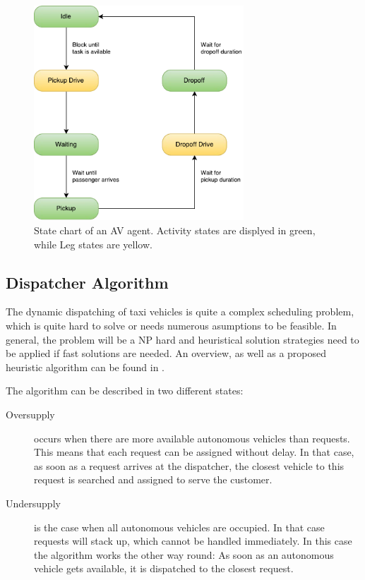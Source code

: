 \begin{figure}
    \centering
    \includegraphics[width=0.7\textwidth]{figures/avstates.pdf}
    \caption{State chart of an AV agent. Activity states are displyed in green, while Leg states are yellow.}
    \label{fig:avstates}
\end{figure}

\subsection{Dispatcher Algorithm}

The dynamic dispatching of taxi vehicles is quite a complex scheduling problem,
which is quite hard to solve or needs numerous asumptions to be feasible. In
general, the problem will be a NP hard and heuristical solution strategies need
to be applied if fast solutions are needed. An overview, as well as a proposed
heuristic algorithm can be found in \citet{Maciejewski2015, Bischoff2016}.

The algorithm can be described in two different states:

\begin{description}
\item[Oversupply] occurs when there are more available autonomous vehicles than
requests. This means that each request can be assigned without delay. In that case,
as soon as a request arrives at the dispatcher, the closest vehicle to this request
is searched and assigned to serve the customer.
\item[Undersupply] is the case when all autonomous vehicles are occupied. In that
case requests will stack up, which cannot be handled immediately. In this case the
algorithm works the other way round: As soon as an autonomous vehicle gets available,
it is dispatched to the closest request.
\end{description}

